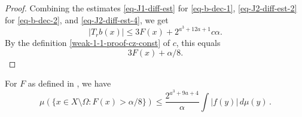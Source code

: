 \begin{proof}
Combining the estimates \eqref{eq-J1-diff-est} for \eqref{eq-b-dec-1}, \eqref{eq-J2-diff-est-2} for \eqref{eq-b-dec-2}, and \eqref{eq-J2-diff-est-4}, we get
\begin{equation*}
    |T_rb(x)|\leq 3F(x)+2^{a^3+12a+1}c\alpha.
\end{equation*}
By the definition \eqref{weak-1-1-proof-cz-const} of $c$, this equals
\begin{equation*}
    3F(x)+\alpha/8.
\end{equation*}
\end{proof}

\begin{lemma}
    \label{estimate-F-set}
    For $F$ as defined in , we have
    \begin{equation}
        \label{eq-F-X-minus-Omega}
        \mu(\{x\in X\setminus\Omega: F(x)>\alpha/8\}) \le \frac{2^{a^3+9a+4}}{\alpha} \int |f(y)|\,d\mu(y)\,.
    \end{equation}
\end{lemma}

